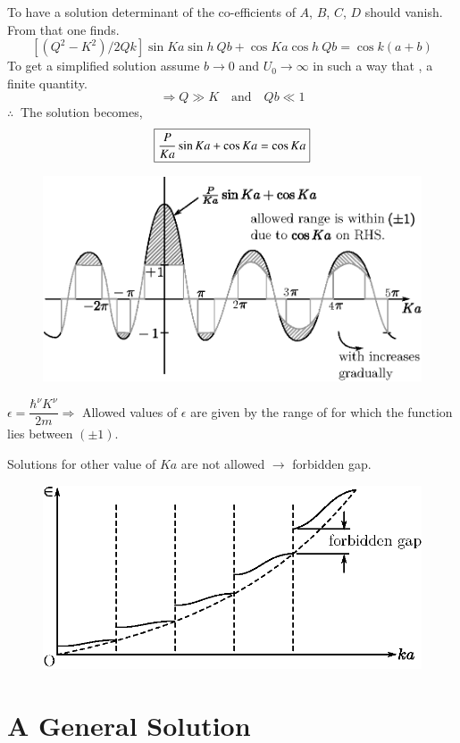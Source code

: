 To have a solution determinant of the co-efficients of $A$, $B$, $C$, $D$ should vanish. From that one finds.
$$
[(Q^{2}-K^{2})/2Qk]\sin Ka \sin h \ Qb+\cos Ka \cos h \ Qb = \cos k(a+b)
$$
To get a simplified solution assume $b\to 0$ and $U_{0}\to \infty$ in such a way that , a finite quantity.
$$
\Rightarrow Q\gg K\quad \text{and}\quad Qb\ll 1
$$
$\therefore \ $ The solution becomes,
$$
\fbox{$\dfrac{P}{Ka}\sin Ka + \cos Ka=\cos Ka$}
$$
\begin{figure}[H]
\centering
\includegraphics[scale=.9]{images/lecture21/fig3.eps}
\end{figure}

$\epsilon = \dfrac{\hbar^{\nu}K^{\nu}}{2m}\Rightarrow$ Allowed values of $\epsilon$ are given by the range of  for which the function lies between $(\pm 1)$.

Solutions for other value of $Ka$ are not allowed $\to$ forbidden gap.
\begin{figure}[H]
\centering
\includegraphics[scale=.9]{images/lecture21/fig4.eps}
\end{figure}

\section*{A General Solution}

